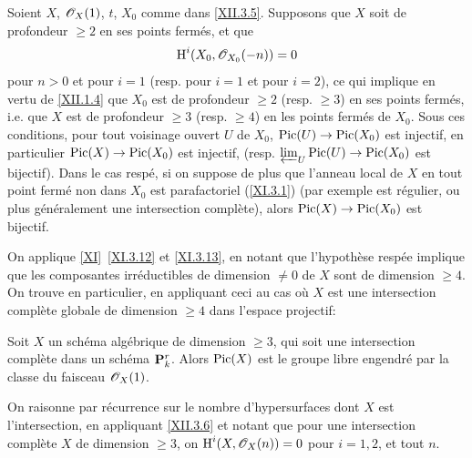 \begin{corollaire} \label{XII.3.6} Soient $X$, $\mathscr{O}_X(1)$, $t$, $X_0$ comme dans \ref{XII.3.5}. Supposons que $X$ soit de profondeur $\geq 2$ en ses points ferm\'es, et que
\[
\operatorname{H}^i(X_0, {\mathscr O}_{X_0}(-n))=0
\]
pour $n>0$ et pour $i=1$ (resp. pour $i=1$ et pour $i=2$), ce qui implique en vertu de \ref{XII.1.4} que $X_0$ est de profondeur $\geq 2$ (resp. $\geq 3$) en ses points ferm\'es, i.e. que $X$ est de profondeur $\geq 3$ (resp. $\geq 4$) en les points ferm\'es de $X_0$. Sous ces conditions, pour tout voisinage ouvert $U$ de $X_0$, $\Pic(U)\to\Pic(X_0)$ est injectif, en particulier $\Pic(X)\to\Pic(X_0)$ est injectif, (resp. $\varprojlim_U \Pic(U)\to\Pic(X_0)$ est bijectif). Dans le cas resp\'e, si on suppose de plus que l'anneau local de $X$ en tout point ferm\'e non dans $X_0$ est parafactoriel (\ref{XI.3.1}) (par exemple est r\'egulier, ou plus g\'en\'eralement une intersection compl\`ete), alors $\Pic(X)\to\Pic(X_0)$ est bijectif.
\end{corollaire}
On applique \ref{XI}~\ref{XI.3.12} et \ref{XI.3.13}, en notant que l'hypoth\`ese resp\'ee implique que les composantes irr\'eductibles de dimension $\neq 0$ de $X$ sont de dimension $\geq 4$. On trouve en particulier, en appliquant ceci au cas o\`u $X$ est une intersection compl\`ete globale de dimension $\geq 4$ dans l'espace projectif:

\begin{corollaire} \label{XII.3.7} Soit $X$ un sch\'ema alg\'ebrique de dimension $\geq 3$, qui soit une intersection compl\`ete dans un sch\'ema ${\mathbf P}_k^r$. Alors $\operatorname{Pic}(X)$ est le groupe libre engendr\'e par la classe du faisceau $\mathscr{O}_X(1)$.
\end{corollaire}
On raisonne par r\'ecurrence sur le nombre d'hypersurfaces dont $X$ est l'intersection, en appliquant \ref{XII.3.6} et notant que pour une intersection compl\`ete $X$ de dimension $\geq 3$, on $\operatorname{H}^i(X, \mathscr{O}_X(n))=0$ pour $i=1, 2$, et tout $n$.

